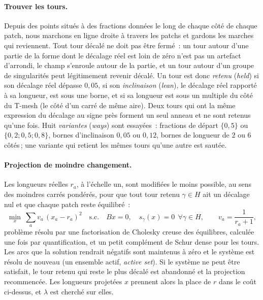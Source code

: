 \documentclass[11pt,a4paper]{article}
\newcommand{\shift}{s}
\begin{document}
\paragraph{Trouver les tours.}
Depuis des points situés à des fractions données le long de chaque côté de
chaque patch, nous marchons en ligne droite à travers les patchs et gardons
les marches qui reviennent. Tout tour décalé ne doit pas être fermé~: un
tour autour d'une partie de la forme dont le décalage réel est loin de zéro
n'est pas un artefact d'arrondi, le champ s'enroule autour de la partie, et
un tour autour d'un groupe de singularités peut légitimement revenir
décalé. Un tour est donc \emph{retenu} (\emph{held}) si son décalage réel
dépasse $0,05$, si son \emph{inclinaison} (\emph{lean}), le décalage réel
rapporté à sa longueur, est sous une borne, et si sa longueur est sous un
multiple du côté du T-mesh (le côté d'un carré de même aire). Deux tours qui
ont la même expression du décalage au signe près forment un seul anneau et
ne sont retenus qu'une fois. Huit \emph{variantes} (\emph{ways}) sont
essayées~: fractions de départ $\{0,5\}$ ou $\{0,2 ; 0,5 ; 0,8\}$, bornes
d'inclinaison $0,05$ ou $0,12$, bornes de longueur de $2$ ou $6$ côtés\,; une
variante qui retient les mêmes tours qu'une autre est sautée.

\paragraph{Projection de moindre changement.}
Les longueurs réelles $r_a$, à l'échelle un, sont modifiées le moins
possible, au sens des moindres carrés pondérés, pour que tout tour retenu
$\gamma \in H$ ait un décalage nul et que chaque patch reste équilibré~:
\[
  \min_{x}\ \sum_a v_a\,(x_a - r_a)^2
  \quad\text{s.c.}\quad B x = 0,\quad \shift_\gamma(x) = 0\ \ \forall\gamma\in H,
  \qquad v_a = \frac{1}{r_a + 1},
\]
problème résolu par une factorisation de Cholesky creuse des équilibres,
calculée une fois par quantification, et un petit complément de Schur dense
pour les tours. Les arcs que la solution rendrait négatifs sont maintenus à
zéro et le système est résolu de nouveau (un ensemble actif, \emph{active
set}). Si le système ne peut être satisfait, le tour retenu qui reste le
plus décalé est abandonné et la projection recommencée. Les longueurs
projetées $x$ prennent alors la place de $r$ dans le coût ci-dessus, et
$\lambda$ est cherché sur elles.
\end{document}
